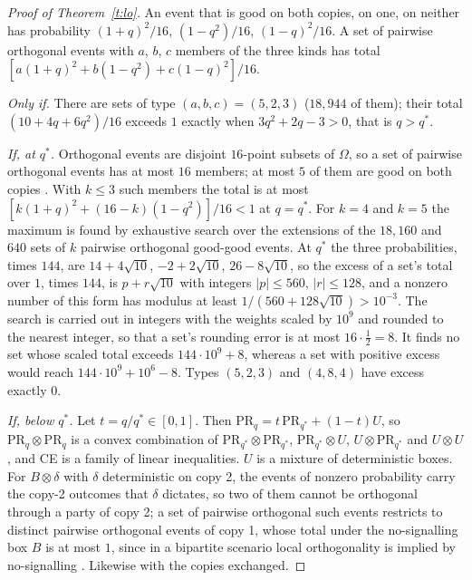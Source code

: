 \documentclass[11pt,a4paper]{article}
\theoremstyle{definition}
\theoremstyle{remark}
\newcommand{\PR}{\mathrm{PR}}
\begin{document}
\begin{proof}[Proof of Theorem~\ref{t:lo}]
An event that is good on both copies, on one, on neither has probability $(1+q)^2/16$, $(1-q^2)/16$,
$(1-q)^2/16$. A set of pairwise orthogonal events with $a$, $b$, $c$ members of the three kinds has
total $[a(1+q)^2+b(1-q^2)+c(1-q)^2]/16$.

\emph{Only if.} There are sets of type $(a,b,c)=(5,2,3)$ ($18{,}944$ of them); their total
$(10+4q+6q^2)/16$ exceeds $1$ exactly when $3q^2+2q-3>0$, that is $q>q^*$.

\emph{If, at $q^*$.} Orthogonal events are disjoint $16$-point subsets of $\Omega$, so a set of pairwise
orthogonal events has at most $16$ members; at most $5$ of them are good on both copies \cite{Sainz}.
With $k\le3$ such members the total is at most $[k(1+q)^2+(16-k)(1-q^2)]/16<1$ at $q=q^*$. For $k=4$
and $k=5$ the maximum is found by exhaustive search over the extensions of the $18{,}160$ and $640$
sets of $k$ pairwise orthogonal good-good events. At $q^*$ the three probabilities, times $144$, are
$14+4\sqrt{10}$, $-2+2\sqrt{10}$, $26-8\sqrt{10}$, so the excess of a set's total over $1$, times $144$,
is $p+r\sqrt{10}$ with integers $|p|\le560$, $|r|\le128$, and a nonzero number of this form has modulus
at least $1/(560+128\sqrt{10})>10^{-3}$. The search is carried out in integers with the weights scaled by
$10^9$ and rounded to the nearest integer, so that a set's rounding error is at most $16\cdot\frac12=8$.
It finds no set whose scaled total exceeds $144\cdot10^9+8$, whereas a set with positive excess would
reach $144\cdot10^9+10^6-8$. Types
$(5,2,3)$ and $(4,8,4)$ have excess exactly $0$.

\emph{If, below $q^*$.} Let $t=q/q^*\in[0,1]$. Then $\PR_q=t\,\PR_{q^*}+(1-t)U$, so $\PR_q\otimes\PR_q$
is a convex combination of $\PR_{q^*}\otimes\PR_{q^*}$, $\PR_{q^*}\otimes U$, $U\otimes\PR_{q^*}$ and
$U\otimes U$, and CE is a family of linear inequalities. $U$ is a mixture of deterministic boxes. For
$B\otimes\delta$ with $\delta$ deterministic on copy 2, the events of nonzero probability carry the
copy-2 outcomes that $\delta$ dictates, so two of them cannot be orthogonal through a party of copy 2; a
set of pairwise orthogonal such events restricts to distinct pairwise orthogonal events of copy 1, whose
total under the no-signalling box $B$ is at most $1$, since in a bipartite scenario local orthogonality
is implied by no-signalling \cite{Sainz}. Likewise with the copies exchanged.
\end{proof}
\end{document}
